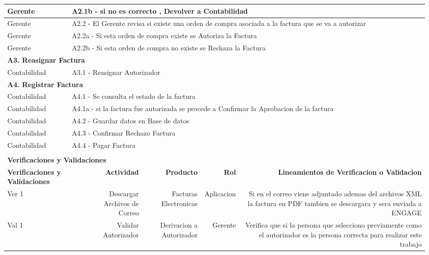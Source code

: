 \begin{longtable}{|llrrrrrr|}
    Gerente & \multicolumn{7}{|l|}{A2.1b - si no es correcto , Devolver a Contabilidad} \\ \hline
    Gerente & \multicolumn{7}{|m{12cm}|}{A2.2 - El Gerente revisa si existe una orden de compra asociada a la factura que se va a autorizar } \\ \hline
    Gerente & \multicolumn{7}{|l|}{A2.2a - Si esta orden de compra existe se Autoriza la Factura } \\ \hline
	Gerente & \multicolumn{7}{|l|}{A2.2b - Si esta orden de compra no existe se Rechaza la Factura } \\ \hline
    \multicolumn{8}{|l|}{\textbf{A3. Reasignar Factura}} \\ \hline
    Contabilidad & \multicolumn{7}{|l|}{A3.1 - Reasignar Autorizador} \\ \hline
    \multicolumn{8}{|l|}{\textbf{A4. Registrar Factura}} \\ \hline
    Contabilidad & \multicolumn{7}{|l|}{A4.1 - Se consulta el estado de la factura} \\ \hline
    Contabilidad & \multicolumn{7}{|m{12cm}|}{A4.1a - si la factura fue autorizada se procede a Confirmar la Aprobacion de la factura} \\ \hline
    Contabilidad  & \multicolumn{7}{|l|}{A4.2 - Guardar datos en Base de datos} \\ \hline
    Contabilidad  & \multicolumn{7}{|l|}{A4.3 - Confirmar Rechazo Factura} \\ \hline
    Contabilidad  & \multicolumn{7}{|l|}{A4.4 - Pagar Factura} \\ \hline
     & & & & & & & \\ \hline
	\multicolumn{8}{|l|}{\textbf{Verificaciones y Validaciones}} \\ \hline
	\multicolumn{2}{|m{3cm}|}{\textbf{Verificaciones y Validaciones}} & \multicolumn{1}{m{2cm}|}{\textbf{Actividad}} & \multicolumn{1}{m{2,2cm}|}{\textbf{Producto}} & \multicolumn{1}{m{1.5cm}|}{\textbf{Rol}} &\multicolumn{3}{m{4cm}|}{\textbf{Lineamientos de Verificacion o Validacion}} \\ \hline
	\multicolumn{2}{|m{3cm}|}{Ver 1} & \multicolumn{1}{m{2cm}|}{Descargar Archivos de Correo} & \multicolumn{1}{m{2.2cm}|}{Facturas Electronicas} & \multicolumn{1}{m{2cm}|}{Aplicacion} & \multicolumn{3}{m{4cm}|}{Si en el correo viene adjuntado ademas del archivos XML la factura en PDF tambien se descargara y sera enviada a ENGAGE} \\ \hline
	\multicolumn{2}{|m{3cm}|}{Val 1} & \multicolumn{1}{m{2cm}|}{Validar Autorizador} & \multicolumn{1}{m{2.2cm}|}{Derivacion a Autorizador} & \multicolumn{1}{m{2cm}|}{Gerente} & \multicolumn{3}{m{4cm}|}{Verifica que si la persona que selecciono previamente como el autorizador es la persona correcta para realizar este trabajo} \\ \hline
		

\end{longtable}
